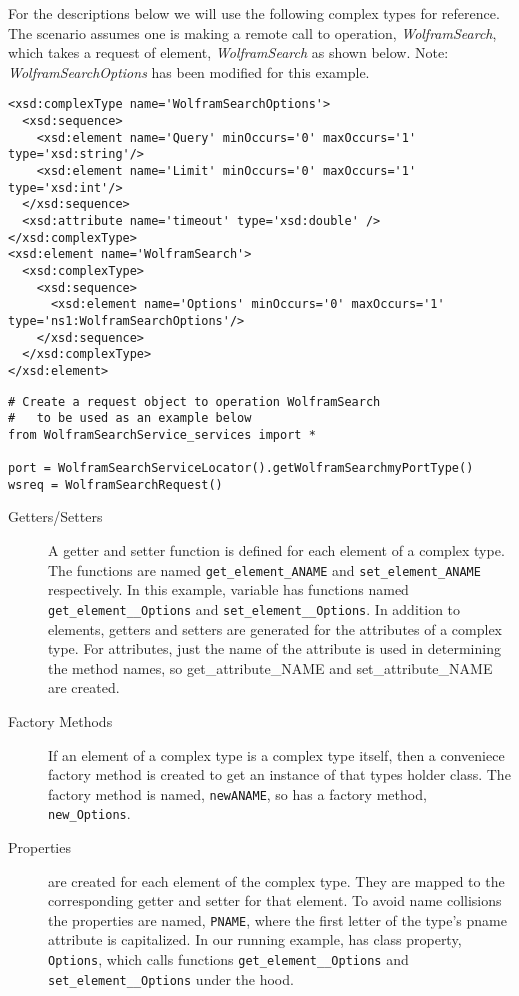 For the descriptions below we will use the following complex types for
reference.  The scenario assumes one is making a remote call to operation, {\it
WolframSearch}, which takes a request of element, {\it WolframSearch} as shown
below. {\small Note: {\it WolframSearchOptions} has been modified for this example.}
\begin{verbatim}
<xsd:complexType name='WolframSearchOptions'>
  <xsd:sequence>
    <xsd:element name='Query' minOccurs='0' maxOccurs='1' type='xsd:string'/>
    <xsd:element name='Limit' minOccurs='0' maxOccurs='1' type='xsd:int'/>
  </xsd:sequence>
  <xsd:attribute name='timeout' type='xsd:double' />
</xsd:complexType>
<xsd:element name='WolframSearch'>
  <xsd:complexType>
    <xsd:sequence>
      <xsd:element name='Options' minOccurs='0' maxOccurs='1' type='ns1:WolframSearchOptions'/>
    </xsd:sequence>
  </xsd:complexType>
</xsd:element>
\end{verbatim}

\begin{verbatim}
# Create a request object to operation WolframSearch
#   to be used as an example below
from WolframSearchService_services import *

port = WolframSearchServiceLocator().getWolframSearchmyPortType()
wsreq = WolframSearchRequest()
\end{verbatim}

\begin{description}
\item[Getters/Setters] A getter and setter function is defined for each element
of a complex type.  The functions are named \verb!get_element_ANAME! and
\verb!set_element_ANAME! respectively.  In this example, variable 
has functions named \verb!get_element__Options! and \verb!set_element__Options!.
 In addition to elements, getters and setters are generated for the attributes
 of a complex type.  For attributes, just the name of the attribute is used in
 determining the method names, so get_attribute_NAME and set_attribute_NAME are
 created.

\item[Factory Methods] If an element of a complex type is a complex type itself,
then a conveniece factory method is created to get an instance of that types
holder class.  The factory method is named, \verb!newANAME!, so  has
a factory method, \verb!new_Options!.

\item[Properties]
are created for each element of the complex type.  They are mapped to the
corresponding getter and setter for that element.  To avoid name collisions the
properties are named, \verb!PNAME!, where the first letter of the type's pname
attribute is capitalized.  In our running example,  has class
property, \verb!Options!, which calls functions \verb!get_element__Options! and
\verb!set_element__Options! under the hood.

\end{description}

